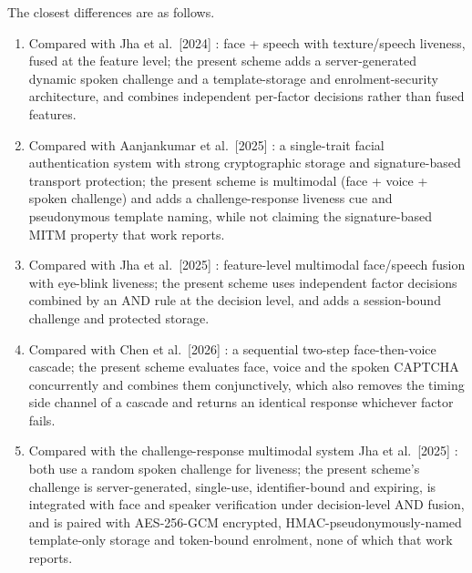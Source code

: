 \documentclass[10pt,journal,compsoc]{IEEEtran}
\begin{document}
{\noindent The closest differences are as follows.
\begin{enumerate}
\item Compared with Jha et al.\ [2024] \cite{jha2024featurefusion}: face + speech with texture/speech liveness, fused at the feature level; the present scheme adds a server-generated dynamic spoken challenge and a template-storage and enrolment-security architecture, and combines independent per-factor decisions rather than fused features.
\item Compared with Aanjankumar et al.\ [2025] \cite{aanjankumar2025smartcity}: a single-trait facial authentication system with strong cryptographic storage and signature-based transport protection; the present scheme is multimodal (face + voice + spoken challenge) and adds a challenge-response liveness cue and pseudonymous template naming, while not claiming the signature-based MITM property that work reports.
\item Compared with Jha et al.\ [2025] \cite{jha2025ensemble}: feature-level multimodal face/speech fusion with eye-blink liveness; the present scheme uses independent factor decisions combined by an AND rule at the decision level, and adds a session-bound challenge and protected storage.
\item Compared with Chen et al.\ [2026] \cite{chen2026twostep}: a sequential two-step face-then-voice cascade; the present scheme evaluates face, voice and the spoken CAPTCHA concurrently and combines them conjunctively, which also removes the timing side channel of a cascade and returns an identical response whichever factor fails.
\item Compared with the challenge-response multimodal system Jha et al.\ [2025] \cite{jha2025challenge}: both use a random spoken challenge for liveness; the present scheme's challenge is server-generated, single-use, identifier-bound and expiring, is integrated with face and speaker verification under decision-level AND fusion, and is paired with AES-256-GCM encrypted, HMAC-pseudonymously-named template-only storage and token-bound enrolment, none of which that work reports.
\end{enumerate}

}
\end{document}

